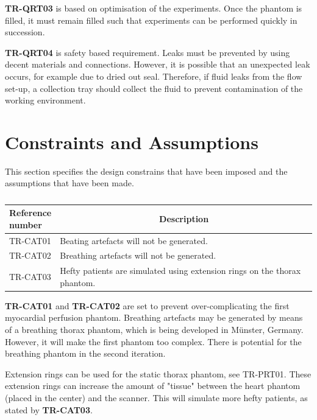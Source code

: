 \textbf{TR-QRT03} is based on optimisation of the experiments. Once the phantom is filled, it must remain filled such that experiments can be performed quickly in succession. 

\textbf{TR-QRT04} is safety based requirement. Leaks must be prevented by using decent materials and connections. However, it is possible that an unexpected leak occurs, for example due to dried out seal. Therefore, if fluid leaks from the flow set-up, a collection tray should collect the fluid to prevent contamination of the working environment.


\section{Constraints and Assumptions}
This section specifies the design constrains that have been imposed and the assumptions that have been made.

\begin{table}[H]
\caption{}
\label{tab:constassump}
\begin{tabular}{l|p{120mm}|}
	\makecell[l]{\textbf{Reference} \\ \textbf{number}} & \multicolumn{1}{c}{\textbf{Description}}\\
	\hline
	TR-CAT01 & Beating artefacts will not be generated. \\
	TR-CAT02 & Breathing artefacts will not be generated. \\
	TR-CAT03 & Hefty patients are simulated using extension rings on the thorax phantom.  \\
	\cline{2-2}
\end{tabular}
\end{table}

\textbf{TR-CAT01} and \textbf{TR-CAT02} are set to prevent over-complicating the first myocardial perfusion phantom. Breathing artefacts may be generated by means of a breathing thorax phantom, which is being developed in Münster, Germany. However, it will make the first phantom too complex. There is potential for the breathing phantom in the second iteration.

Extension rings can be used for the static thorax phantom, see TR-PRT01. These extension rings can increase the amount of "tissue" between the heart phantom (placed in the center) and the scanner. This will simulate more hefty patients, as stated by \textbf{TR-CAT03}.
